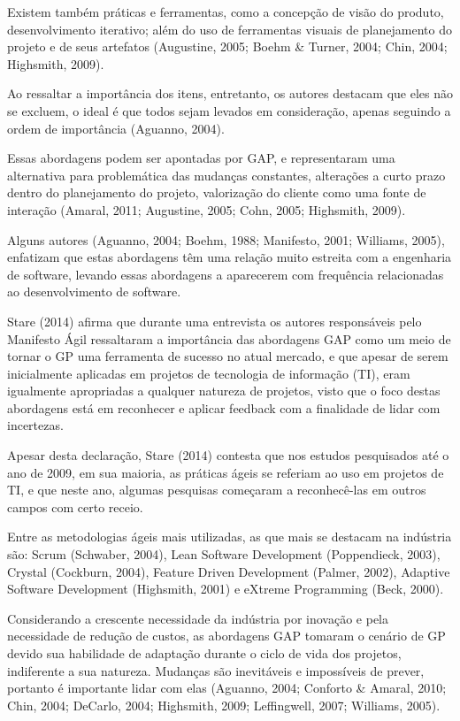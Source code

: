Existem também práticas e ferramentas, como a concepção de visão do produto, desenvolvimento iterativo; além do uso de ferramentas visuais de planejamento do projeto e de seus artefatos (Augustine, 2005; Boehm \& Turner, 2004; Chin, 2004; Highsmith, 2009).

Ao ressaltar a importância dos itens, entretanto, os autores destacam que eles não se excluem, o ideal é que todos sejam levados em consideração, apenas seguindo a ordem de importância (Aguanno, 2004).

Essas abordagens podem ser apontadas por GAP, e representaram uma alternativa para problemática das mudanças constantes, alterações a curto prazo dentro do planejamento do projeto, valorização do cliente como uma fonte de interação (Amaral, 2011; Augustine, 2005; Cohn, 2005; Highsmith, 2009).

Alguns autores (Aguanno, 2004; Boehm, 1988; Manifesto, 2001; Williams, 2005), enfatizam que estas abordagens têm uma relação muito estreita com a engenharia de software, levando essas abordagens a aparecerem com frequência relacionadas ao desenvolvimento de software.

Stare (2014) afirma que durante uma entrevista os autores responsáveis pelo Manifesto Ágil ressaltaram a importância das abordagens GAP como um meio de tornar o GP uma ferramenta de sucesso no atual mercado, e que apesar de serem inicialmente aplicadas em projetos de tecnologia de informação (TI), eram igualmente apropriadas a qualquer natureza de projetos, visto que o foco destas abordagens está em reconhecer e aplicar feedback com a finalidade de lidar com incertezas.

Apesar desta declaração, Stare (2014) contesta que nos estudos pesquisados até o ano de 2009, em sua maioria, as práticas ágeis se referiam ao uso em projetos de TI, e que neste ano, algumas pesquisas começaram a reconhecê-las em outros campos com certo receio.

Entre as metodologias ágeis mais utilizadas, as que mais se destacam na indústria são: Scrum (Schwaber, 2004), Lean Software Development (Poppendieck, 2003), Crystal (Cockburn, 2004), Feature Driven Development (Palmer, 2002), Adaptive Software Development (Highsmith, 2001) e eXtreme Programming (Beck, 2000).

Considerando a crescente necessidade da indústria por inovação e pela necessidade de redução de custos, as abordagens GAP tomaram o cenário de GP devido sua habilidade de adaptação durante o ciclo de vida dos projetos, indiferente a sua natureza. Mudanças são inevitáveis e impossíveis de prever, portanto é importante lidar com elas (Aguanno, 2004; Conforto \& Amaral, 2010; Chin, 2004; DeCarlo, 2004; Highsmith, 2009; Leffingwell, 2007; Williams, 2005).

